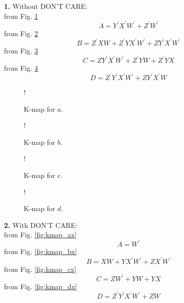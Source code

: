 \documentclass[journal,12pt,twocolumn]{IEEEtran}
\begin{document}
\begin{enumerate}[1.]
\textbf{1.} Without DON'T CARE: \\
from Fig. \ref{fig:kmap_a}
\begin{equation}
	A = Y^{\prime}X^{\prime}W^{\prime}+Z^{\prime}W^{\prime}
\end{equation}
from Fig. \ref{fig:kmap_b}
\begin{equation}
	B = Z^{\prime}XW+Z^{\prime}YX^{\prime}W^{\prime}+ZY^{\prime}X^{\prime}W^{\prime}
\end{equation}
from Fig.  \ref{fig:kmap_c}
\begin{equation}
	C = ZY^{\prime}X^{\prime}W^{\prime}+Z^{\prime}YW+Z^{\prime}YX
\end{equation}
from Fig. \ref{fig:kmap_d}
\begin{equation}
	D = Z^{\prime}Y^{\prime}X^{\prime}W^{\prime}+ZY^{\prime}X^{\prime}W
\end{equation}

\begin{figure}[!h]
	\resizebox {\columnwidth} {!} {
		
	}
	\caption{K-map for $a$.}
	\label{fig:kmap_a}
\end{figure}
\begin{figure}[!h]
	\resizebox {\columnwidth} {!} {
		
	}
	\caption{K-map for $b$.}
	\label{fig:kmap_b}
\end{figure}
\begin{figure}[!h]
	\resizebox {\columnwidth} {!} {
		
	}
	\caption{K-map for $c$.}
	\label{fig:kmap_c}
\end{figure}
\begin{figure}[!h]
	\resizebox {\columnwidth} {!} {
		
	}
	\caption{K-map for $d$.}
	\label{fig:kmap_d}
\end{figure}
\textbf{2.} With DON'T CARE: \\
from Fig. \ref{fig:kmap_ax}
\begin{equation}
	A = W^{\prime}
\end{equation}
from Fig. \ref{fig:kmap_bx}
\begin{equation}
	B = XW+YX^{\prime}W^{\prime}+ZX^{\prime}W^{\prime}
\end{equation}
from Fig.  \ref{fig:kmap_cx}
\begin{equation}
	C = ZW^{\prime}+YW+YX
\end{equation}
from Fig. \ref{fig:kmap_dx}
\begin{equation}
	D = Z^{\prime}Y^{\prime}X^{\prime}W^{\prime}+ZW
\end{equation}


\end{enumerate}
\end{document}
